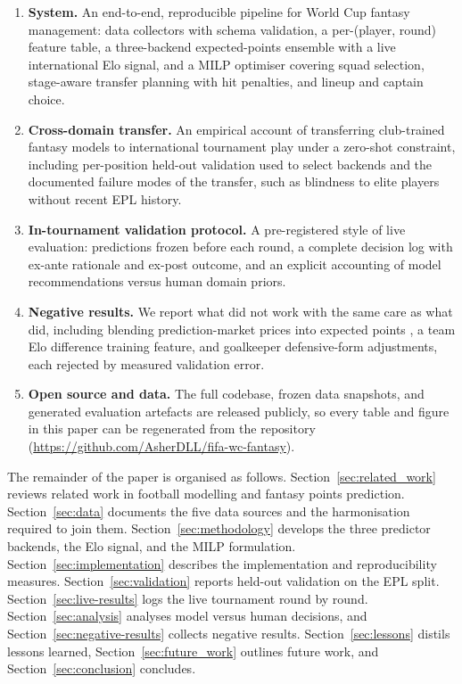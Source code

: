 \begin{enumerate}
\item \textbf{System.} An end-to-end, reproducible pipeline for
  World Cup fantasy management: data collectors with schema
  validation, a per-(player, round) feature table, a three-backend
  expected-points ensemble with a live international Elo signal, and
  a MILP optimiser covering squad selection, stage-aware transfer
  planning with hit penalties, and lineup and captain choice.
\item \textbf{Cross-domain transfer.} An empirical account of
  transferring club-trained fantasy models to international
  tournament play under a zero-shot constraint, including
  per-position held-out validation used to select backends and the
  documented failure modes of the transfer, such as blindness to
  elite players without recent EPL history.
\item \textbf{In-tournament validation protocol.} A pre-registered
  style of live evaluation: predictions frozen before each round, a
  complete decision log with ex-ante rationale and ex-post outcome,
  and an explicit accounting of model recommendations versus human
  domain priors.
\item \textbf{Negative results.} We report what did not work with
  the same care as what did, including blending prediction-market
  prices into expected points \citep{benter1994computer,
  wolfers2004prediction}, a team Elo difference training feature,
  and goalkeeper defensive-form adjustments, each rejected by
  measured validation error.
\item \textbf{Open source and data.} The full codebase, frozen data
  snapshots, and generated evaluation artefacts are released
  publicly, so every table and figure in this paper can be
  regenerated from the repository
  (\url{https://github.com/AsherDLL/fifa-wc-fantasy}).
\end{enumerate}

The remainder of the paper is organised as follows.
Section~\ref{sec:related_work} reviews related work in football
modelling and fantasy points prediction. Section~\ref{sec:data}
documents the five data sources and the harmonisation required to
join them. Section~\ref{sec:methodology} develops the three predictor
backends, the Elo signal, and the MILP formulation.
Section~\ref{sec:implementation} describes the implementation and
reproducibility measures. Section~\ref{sec:validation} reports
held-out validation on the EPL split. Section~\ref{sec:live-results}
logs the live tournament round by round. Section~\ref{sec:analysis}
analyses model versus human decisions, and
Section~\ref{sec:negative-results} collects negative results.
Section~\ref{sec:lessons} distils lessons learned,
Section~\ref{sec:future_work} outlines future work, and
Section~\ref{sec:conclusion} concludes.
